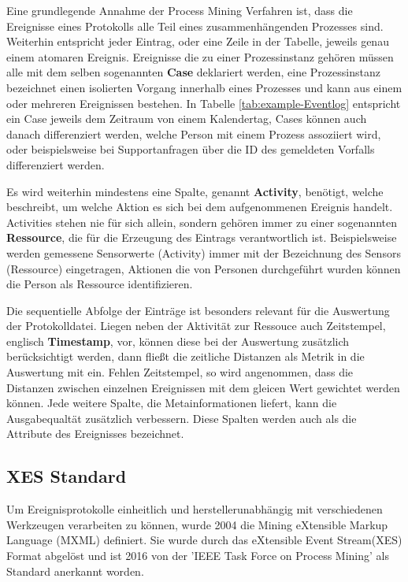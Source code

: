 Eine grundlegende Annahme der Process Mining Verfahren ist, dass die Ereignisse eines Protokolls alle Teil eines zusammenhängenden Prozesses sind. Weiterhin entspricht jeder Eintrag, oder eine Zeile in der Tabelle, jeweils genau einem atomaren Ereignis. Ereignisse die zu einer Prozessinstanz gehören müssen alle mit dem selben sogenannten \textbf{Case} deklariert werden, eine Prozessinstanz bezeichnet einen isolierten Vorgang innerhalb eines Prozesses und kann aus einem oder mehreren Ereignissen bestehen. In Tabelle \ref{tab:example-Eventlog} entspricht ein Case jeweils dem Zeitraum von einem Kalendertag, Cases können auch danach differenziert werden, welche Person mit einem Prozess assoziiert wird, oder beispielsweise bei Supportanfragen über die ID des gemeldeten Vorfalls differenziert werden.

Es wird weiterhin mindestens eine Spalte, genannt \textbf{Activity}, benötigt, welche beschreibt, um welche Aktion es sich bei dem aufgenommenen Ereignis handelt. Activities stehen nie für sich allein,  sondern gehören immer zu einer sogenannten \textbf{Ressource}, die für die Erzeugung des Eintrags verantwortlich ist. Beispielsweise werden gemessene Sensorwerte (Activity) immer mit der Bezeichnung des Sensors (Ressource) eingetragen, Aktionen die von Personen durchgeführt wurden können die Person als Ressource identifizieren.

Die sequentielle Abfolge der Einträge ist besonders relevant für die Auswertung der Protokolldatei. Liegen neben der Aktivität zur Ressouce auch Zeitstempel, englisch \textbf{Timestamp}, vor, können diese bei der Auswertung zusätzlich berücksichtigt werden, dann fließt die zeitliche Distanzen als Metrik in die Auswertung mit ein. Fehlen Zeitstempel, so wird angenommen, dass die Distanzen zwischen einzelnen Ereignissen mit dem gleicen Wert gewichtet werden können.
Jede weitere Spalte, die Metainformationen liefert, kann die Ausgabequaltät zusätzlich verbessern. Diese Spalten werden auch als die Attribute des Ereignisses bezeichnet. 

\subsection{XES Standard}
Um Ereignisprotokolle einheitlich und herstellerunabhängig mit verschiedenen Werkzeugen verarbeiten zu können, wurde 2004 die Mining eXtensible Markup Language (MXML) definiert. Sie wurde durch das eXtensible Event Stream(XES) Format abgelöst \cite{xesmxml} und ist 2016 von der 'IEEE Task Force on Process Mining' als Standard anerkannt worden. 

